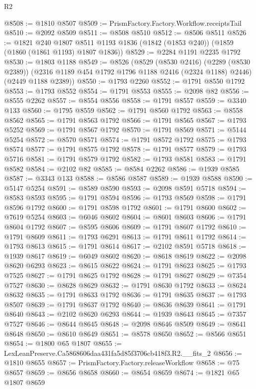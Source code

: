 \begin{lexlean}{R2}
\begin{coremodule}
@8508 := @1810 @8507
@8509 := PrismFactory.Factory.Workflow.receiptsTail
@8510 := @2092 @8509
@8511 := @8508 @8510
@8512 := @8506 @8511
@8526 := @1821
    @240
    @1807
    @8511
    @1193
    @1836
    (@1842 (@1853 @240))
    (@1859 (@1860 (@1861 @1193) @1807 @1836))
@8529 := @2284 @1191 @2235 @1792
@8530 := @1803 @1188
@8549 := @8526
    (@8529
      (@8530 @2416)
      (@2289 (@8530 @2389))
      (@2316 @1189 @454 @1792 @1796 @1188 @2416 (@2324 @1188) @2446)
      (@2449 @1188 @2389))
@8550 := @1793 @2260
@8552 := @1791 @8550 @1792
@8553 := @1793 @8552
@8554 := @1791 @8553
@8555 := @2098 @82
@8556 := @8555 @2262
@8557 := @8554 @8556
@8558 := @1791 @8557
@8559 := @3340 @133
@8560 := @1795 @8559
@8562 := @1791 @8560 @1792
@8563 := @8558 @8562
@8565 := @1791 @8563 @1792
@8566 := @1791 @8565
@8567 := @1793 @5252
@8569 := @1791 @8567 @1792
@8570 := @1791 @8569
@8571 := @5144 @5254
@8572 := @8570 @8571
@8574 := @1791 @8572 @1792
@8575 := @1793 @8574
@8577 := @1791 @8575 @1792
@8578 := @1791 @8577
@8579 := @1793 @5716
@8581 := @1791 @8579 @1792
@8582 := @1793 @8581
@8583 := @1791 @8582
@8584 := @2102 @82
@8585 := @8584 @2262
@8586 := @1939 @8585
@8587 := @3343 @133
@8588 := @8586 @8587
@8589 := @1939 @8588
@8590 := @5147 @5254
@8591 := @8589 @8590
@8593 := @2098 @8591 @5718
@8594 := @8583 @8593
@8595 := @1791 @8594
@8596 := @1793 @8569
@8598 := @1791 @8596 @1792
@8600 := @1791 @8598 @1792
@8601 := @1791 @8600
@8602 := @7619 @5254
@8603 := @6046 @8602
@8604 := @8601 @8603
@8606 := @1791 @8604 @1792
@8607 := @8595 @8606
@8609 := @1791 @8607 @1792
@8610 := @1791 @8609
@8611 := @1793 @6291
@8613 := @1791 @8611 @1792
@8614 := @1793 @8613
@8615 := @1791 @8614
@8617 := @2102 @8591 @5718
@8618 := @1939 @8617
@8619 := @6049 @8602
@8620 := @8618 @8619
@8622 := @2098 @8620 @6293
@8623 := @8615 @8622
@8624 := @1791 @8623
@8625 := @1793 @7525
@8627 := @1791 @8625 @1792
@8628 := @1791 @8627
@8629 := @7354 @7527
@8630 := @8628 @8629
@8632 := @1791 @8630 @1792
@8633 := @8624 @8632
@8635 := @1791 @8633 @1792
@8636 := @1791 @8635
@8637 := @1793 @8507
@8639 := @1791 @8637 @1792
@8640 := @8636 @8639
@8641 := @1791 @8640
@8643 := @2102 @8620 @6293
@8644 := @1939 @8643
@8645 := @7357 @7527
@8646 := @8644 @8645
@8648 := @2098 @8646 @8509
@8649 := @8641 @8648
@8650 := @8610 @8649
@8651 := @8578 @8650
@8652 := @8566 @8651
@8654 := @1800 @65 @1807
@8655 := LexLeanPreserve.Ca5868606daa431fa5d85f3706cb418f3.R2.__fits_2
@8656 := @1810 @8655
@8657 := PrismFactory.Factory.releaseWorkflow
@8658 := @75 @8657
@8659 := @8656 @8658
@8660 := @8654 @8659
@8674 := @1821
    @65
    @1807
    @8659

\end{coremodule}
\end{lexlean}
